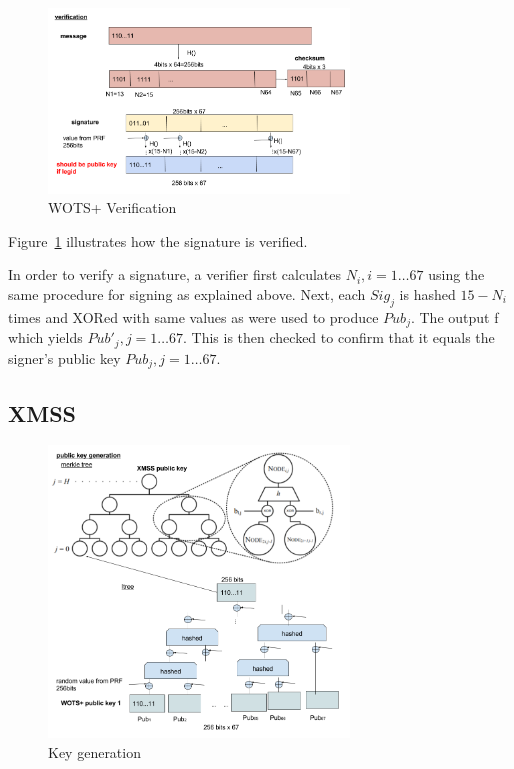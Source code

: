 \documentclass[a4paper,10pt,twocolumn]{article}
\begin{document}
 \begin{figure}[ht]
	\begin{center}
	\includegraphics[width=80mm]{wots_veri.png}
	  \caption{WOTS+ Verification}
    \label{fig:wots_veri}
	\end{center}
 \end{figure}

 Figure~\ref{fig:wots_veri} illustrates how the signature is verified.

 In order to verify a signature, a verifier first calculates \(N_i, i=1 \ldots 67 \) using the same procedure for signing as explained 
 above. Next, each \( Sig_j \) is hashed \(15-N_i\) times and XORed with same values as were used to produce \( Pub_{j} \). The output f 
 which yields \( Pub'_j , j=1 \ldots 67\). This is then checked to confirm that it equals the signer's public key \( Pub_j,  j=1 \ldots 
 67 \).

\subsection{XMSS}

\begin{figure}[ht]
	\begin{center}
	\includegraphics[width=80mm]{xmss_pub.png}
	  \caption{Key generation}
    \label{fig:xmss_pub}
	\end{center}
 \end{figure}
\end{document}

